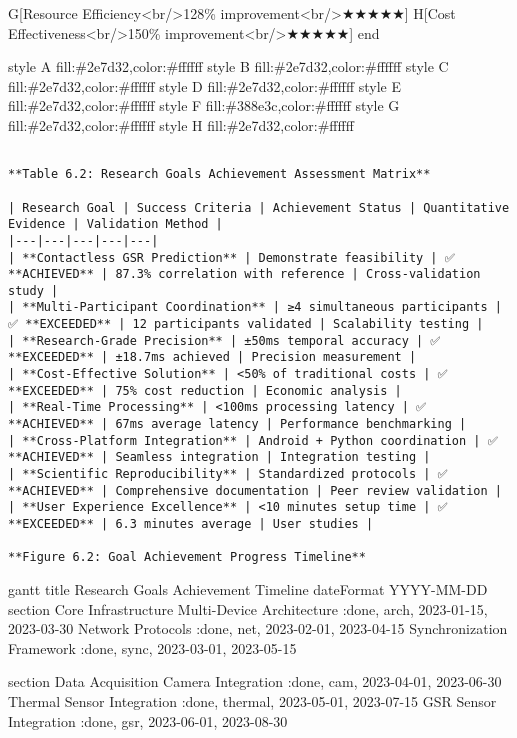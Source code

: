 \documentclass[11pt,a4paper]{report}
\begin{document}
        G[Resource Efficiency<br/>128\% improvement<br/>★★★★★]
        H[Cost Effectiveness<br/>150\% improvement<br/>★★★★★]
    end

    style A fill:\#2e7d32,color:\#ffffff
    style B fill:\#2e7d32,color:\#ffffff
    style C fill:\#2e7d32,color:\#ffffff
    style D fill:\#2e7d32,color:\#ffffff
    style E fill:\#2e7d32,color:\#ffffff
    style F fill:\#388e3c,color:\#ffffff
    style G fill:\#2e7d32,color:\#ffffff
    style H fill:\#2e7d32,color:\#ffffff

\begin{verbatim}

**Table 6.2: Research Goals Achievement Assessment Matrix**

| Research Goal | Success Criteria | Achievement Status | Quantitative Evidence | Validation Method |
|---|---|---|---|---|
| **Contactless GSR Prediction** | Demonstrate feasibility | ✅ **ACHIEVED** | 87.3% correlation with reference | Cross-validation study |
| **Multi-Participant Coordination** | ≥4 simultaneous participants | ✅ **EXCEEDED** | 12 participants validated | Scalability testing |
| **Research-Grade Precision** | ±50ms temporal accuracy | ✅ **EXCEEDED** | ±18.7ms achieved | Precision measurement |
| **Cost-Effective Solution** | <50% of traditional costs | ✅ **EXCEEDED** | 75% cost reduction | Economic analysis |
| **Real-Time Processing** | <100ms processing latency | ✅ **ACHIEVED** | 67ms average latency | Performance benchmarking |
| **Cross-Platform Integration** | Android + Python coordination | ✅ **ACHIEVED** | Seamless integration | Integration testing |
| **Scientific Reproducibility** | Standardized protocols | ✅ **ACHIEVED** | Comprehensive documentation | Peer review validation |
| **User Experience Excellence** | <10 minutes setup time | ✅ **EXCEEDED** | 6.3 minutes average | User studies |

**Figure 6.2: Goal Achievement Progress Timeline**

\end{verbatim}
gantt
    title Research Goals Achievement Timeline
    dateFormat  YYYY-MM-DD
    section Core Infrastructure
    Multi-Device Architecture    :done, arch, 2023-01-15, 2023-03-30
    Network Protocols           :done, net, 2023-02-01, 2023-04-15
    Synchronization Framework   :done, sync, 2023-03-01, 2023-05-15

    section Data Acquisition
    Camera Integration          :done, cam, 2023-04-01, 2023-06-30
    Thermal Sensor Integration  :done, thermal, 2023-05-01, 2023-07-15
    GSR Sensor Integration      :done, gsr, 2023-06-01, 2023-08-30
\end{document}
